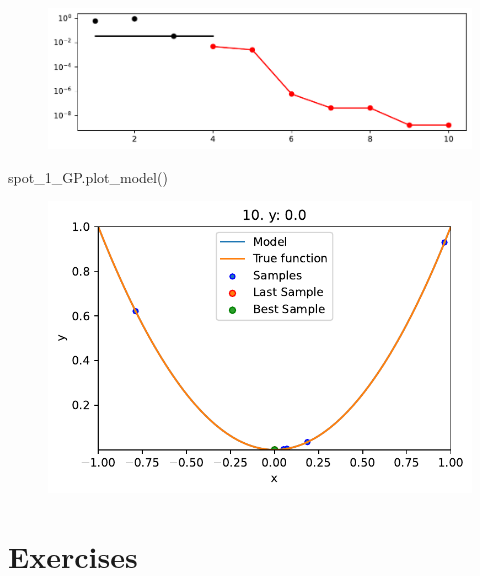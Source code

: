 \documentclass[
  letterpaper,
  DIV=11,
  numbers=noendperiod]{scrreprt}
\newenvironment{Shaded}{\begin{snugshade}}{\end{snugshade}}
\newcommand{\NormalTok}[1]{\textcolor[rgb]{0.00,0.23,0.31}{#1}}
\begin{document}
\begin{figure}[H]

{\centering \includegraphics{010_num_spot_sklearn_surrogate_files/figure-pdf/cell-27-output-1.pdf}

}

\end{figure}

\begin{Shaded}
\begin{Highlighting}[]
\NormalTok{spot\_1\_GP.plot\_model()}
\end{Highlighting}
\end{Shaded}

\begin{figure}[H]

{\centering \includegraphics{010_num_spot_sklearn_surrogate_files/figure-pdf/cell-28-output-1.pdf}

}

\end{figure}

\hypertarget{exercises-4}{%
\section{Exercises}\label{exercises-4}}
\end{document}
